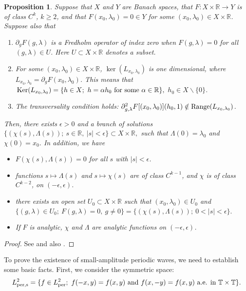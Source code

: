 \documentclass[12pt,reqno,a4paper]{amsart} %
\newcommand{\Ker}{{\rm \,Ker}}
\numberwithin{equation}{section}
\numberwithin{figure}{section}
\newtheorem{proposition}[theorem]{Proposition}
\begin{document}
			\begin{proposition}\label{TCR} Suppose that $X$ and $Y$ are Banach spaces, that $F: X\times \mathbb{R}\rightarrow Y$ is of class $C^k$, $k\geq2$, and that $F(x_0,\lambda_0)=0\in Y$ for some $(x_0,\lambda_0) \in X\times \mathbb{R}$. Suppose also that
				\begin{enumerate}
					\item $\partial_gF(g,\lambda)$ is a Fredholm operator of index zero when $F(g,\lambda)=0$ for all $(g,\lambda)\in U$. Here $U\subset  X\times \mathbb{R}$ denotes a subset.
					\item For some $(x_0,\lambda_0)\in X\times \mathbb{R}$, $\ker(L_{x_0,\lambda_0})$ is one dimensional, where $L_{x_0,\lambda_0}=\partial_gF(x_0,\lambda_0)$. This means that
					$\Ker(L_{x_0,\lambda_0})=\{h\in X;\ h=\alpha h_0\ \mbox{for some}\ \alpha\in\mathbb{R}\},$ $h_0\in X\backslash\{0\}$.
					\item The transversality condition holds: $\partial_{g,\lambda}^2F[(x_0,\lambda_0)](h_0,1)\notin {\rm{Range}}(L_{x_0,\lambda_0})$.
				\end{enumerate} 
				Then, there exists $\epsilon>0$ and a branch of solutions 
				$\{(\chi(s),\Lambda(s));\ s\in\mathbb{R},\ |s|<\epsilon\}\subset  X\times \mathbb{R},$
				such that $\Lambda(0)=\lambda_0$ and $\chi(0)=x_0$. In addition, we have
				\begin{itemize}
					\item $F(\chi(s),\Lambda(s))=0$ for all $s$ with $|s|<\epsilon$.
					\item functions $s\mapsto\Lambda(s)$ and $s\mapsto \chi(s)$ are of class $C^{k-1}$, and $\chi$ is of class $C^{k-2}$, on $(-\epsilon,\epsilon)$.
					\item there exists an open set $U_0\subset X\times\mathbb{R}$ such that $(x_0,\lambda_0)\in U_0$ and 
					$\{(g,\lambda)\in U_0;\ F(g,\lambda)=0,\ g\neq0\}=\{(\chi(s),\Lambda(s));\ 0<|s|<\epsilon\}.$
					\item If $F$ is analytic, $\chi$ and $\Lambda$ are analytic functions on $(-\epsilon,\epsilon)$.					
					\end{itemize}
			\end{proposition}
			\begin{proof} See \cite[Theorem 8.3.1]{buffoni-toland} and also \cite[Page 114]{buffoni-toland}.
				
			\end{proof}
			
				
			To prove the existence of small-amplitude periodic waves, we need to establish some basic facts. First, we consider the symmetric space:			
			$$L_{\rm per,s}^2=\{f\in L_{\rm per}^2;\ f(-x,y)=f(x,y)\ \mbox{and}\ f(x,-y)=f(x,y)\ \mbox{a.e. in}\ \mathbb{T}\times\mathbb{T}\}.$$
			
\end{document}
